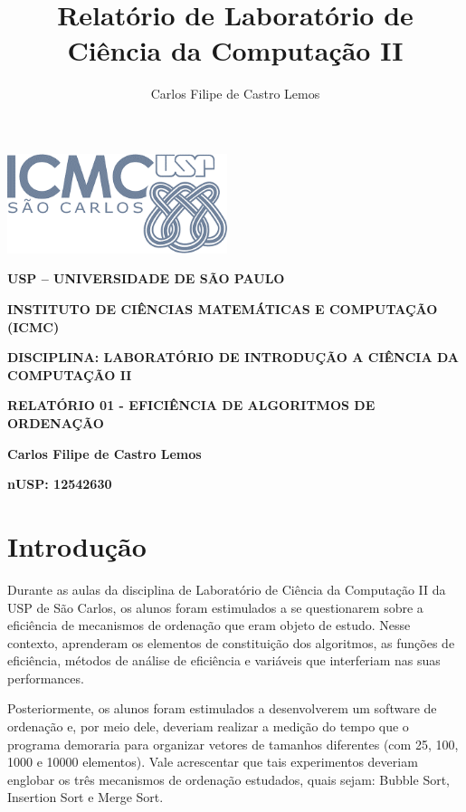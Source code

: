 \documentclass[a4paper, 12pt]{article}
\title{Relatório de Laboratório de Ciência da Computação II}
\author{Carlos Filipe de Castro Lemos}
\begin{document}

\begin{center}
    \includegraphics[width=2.52778in,height=1.14532in]{logotipoICMC.png}

        \textbf{USP -- UNIVERSIDADE DE SÃO PAULO}

        \textbf{INSTITUTO DE CIÊNCIAS MATEMÁTICAS E COMPUTAÇÃO (ICMC)}

        \textbf{DISCIPLINA: LABORATÓRIO DE INTRODUÇÃO A CIÊNCIA DA COMPUTAÇÃO II}

    \vspace{0.9cm}

        \textbf{RELATÓRIO 01 - EFICIÊNCIA DE ALGORITMOS DE ORDENAÇÃO}

        \textbf{Carlos Filipe de Castro Lemos}

        \textbf{nUSP: 12542630}
    \end{center}


\section{Introdução}

\tab{ }Durante as aulas da disciplina de Laboratório de Ciência da Computação II da USP de São Carlos, os alunos foram estimulados a se questionarem sobre a eficiência de mecanismos de ordenação que eram objeto de estudo. Nesse contexto, aprenderam os elementos de constituição dos algoritmos, as funções de eficiência, métodos de análise de eficiência e variáveis que interferiam nas suas performances. 

Posteriormente, os alunos foram estimulados a desenvolverem um software de ordenação e, por meio dele, deveriam realizar a medição do tempo que o programa demoraria para organizar vetores de tamanhos diferentes (com 25, 100, 1000 e 10000 elementos). Vale acrescentar que tais experimentos deveriam englobar os três mecanismos de ordenação estudados, quais sejam: Bubble Sort, Insertion Sort e Merge Sort.
\end{document}
